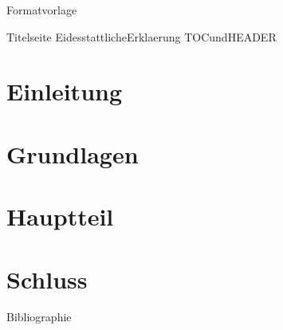  {Formatvorlage}

 {Titelseite}
 {EidesstattlicheErklaerung}
 {TOCundHEADER}

\section{Einleitung}
\section{Grundlagen}
\section{Hauptteil}
\section{Schluss}

 {Bibliographie}


